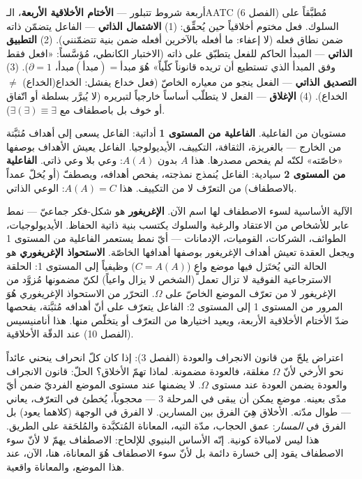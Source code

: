 \documentclass[10pt, openany, oneside]{book}
\begin{document}
أربعة شروط تتبلور --- \textbf{الأختام الأخلاقية الأربعة}، الـAATC (الفصل 6) مُطبَّقاً على السلوك. فعل مختوم أخلاقياً حين يُحقِّق: (1) \textbf{الاشتمال الذاتي} --- الفاعل يتضمّن ذاته ضمن نطاق فعله (لا إعفاء: ما أفعله بالآخرين أفعله ضمن بنية تتضمّنني). (2) \textbf{التطبيق الذاتي} --- المبدأ الحاكم للفعل يتطبّق على ذاته (الاختبار الكانطي، مُؤسَّساً: «افعل فقط وفق المبدأ الذي تستطيع أن تريده قانوناً كلّياً» هُوَ $\text{مبدأ}(\text{مبدأ}) = \text{مبدأ}$، $\partial = 1$). (3) \textbf{التصديق الذاتي} --- الفعل ينجو من معياره الخاصّ (فعل خداع يفشل: الخداع(الخداع) $\neq$ الخداع). (4) \textbf{الإغلاق} --- الفعل لا يتطلّب أساساً خارجياً لتبريره (لا يُبرَّر بسلطة أو اتّفاق أو خوف بل باصطفاف مع $\exists(\exists) \equiv \exists$).

مستويان من الفاعلية. \textbf{الفاعلية من المستوى 1} أداتية: الفاعل يسعى إلى أهداف مُثبَّتة من الخارج --- بالغريزة، الثقافة، التكييف، الأيديولوجيا. الفاعل يعيش الأهداف بوصفها «خاصّته» لكنّه لم يفحص مصدرها. هذا $A$ بدون $A(A)$: وعي بلا وعي ذاتي. \textbf{الفاعلية من المستوى 2} سيادية: الفاعل يُنمذج نمذجته، يفحص أهدافه، ويصطفّ (أو يُخلّ عمداً بالاصطفاف) من التعرّف لا من التكييف. هذا $A(A) = C$: الوعي الذاتي.

الآلية الأساسية لسوء الاصطفاف لها اسم الآن. \textbf{الإغريغور} هو شكل-فكر جماعيّ --- نمط عابر للأشخاص من الاعتقاد والرغبة والسلوك يكتسب بنية ذاتية الحفاظ. الأيديولوجيات، الطوائف، الشركات، القوميات، الإدمانات --- أيّ نمط يستعمر الفاعلية من المستوى 1 ويجعل العقدة تعيش أهداف الإغريغور بوصفها أهدافها الخاصّة. \textbf{الاستحواذ الإغريغوري} هو الحالة التي يُختَزل فيها موضع واعٍ ($C = A(A)$) وظيفياً إلى المستوى 1: الحلقة الاسترجاعية الفوقية لا تزال تعمل (الشخص لا يزال واعياً) لكنّ مضمونها مُزوَّد من الإغريغور لا من تعرّف الموضع الخاصّ على $\Omega$. التحرّر من الاستحواذ الإغريغوري هُوَ المرور من المستوى 1 إلى المستوى 2: الفاعل يتعرّف على أنّ أهدافه مُثبَّتة، يفحصها ضدّ الأختام الأخلاقية الأربعة، ويعيد اختيارها من التعرّف أو يتخلّص منها. هذا أنامنيسيس (الفصل 10) عند الدقّة الأخلاقية.

اعتراض يلحّ من قانون الانجراف والعودة (الفصل 3): إذا كان كلّ انحراف ينحني عائداً نحو الأرخي لأنّ $\Omega$ مغلقة، فالعودة مضمونة. لماذا تهمّ الأخلاق؟ الحلّ: قانون الانجراف والعودة يضمن العودة عند مستوى $\Omega$. لا يضمنها عند مستوى الموضع الفرديّ ضمن أيّ مدًى بعينه. موضع يمكن أن يبقى في المرحلة 3 --- محجوباً، يُخطئ في التعرّف، يعاني --- طوال مدّته. الأخلاق هِيَ الفرق بين المسارين. لا الفرق في الوجهة (كلاهما يعود) بل الفرق في \textit{المسار}: عمق الحجاب، مدّة التيه، المعاناة المُتكبَّدة والمُلحَقة على الطريق. هذا ليس لامبالاة كونية. إنّه الأساس البنيوي للإلحاح: الاصطفاف يهمّ لا لأنّ سوء الاصطفاف يقود إلى خسارة دائمة بل لأنّ سوء الاصطفاف هُوَ المعاناة، هنا، الآن، عند هذا الموضع، والمعاناة واقعية.
\end{document}
